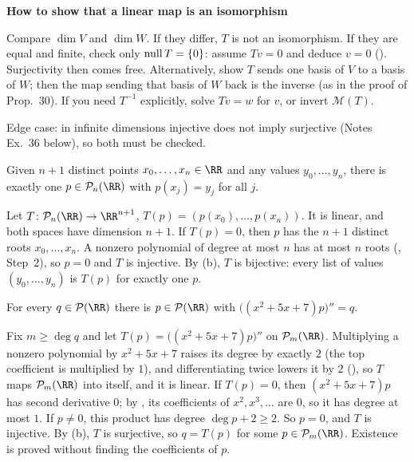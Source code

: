\documentclass[10pt]{scrartcl}
\newcommand{\PP}{\mathcal P}\newcommand{\LL}{\mathcal L}\newcommand{\MM}{\mathcal M}
\newenvironment{methodbox}[1]{\begin{mdframed}[style=methodstyle]\textbf{\color{NavyBlue}#1}\par\vspace{2pt}}{\end{mdframed}}
\begin{document}
\begin{methodbox}{How to show that a linear map is an isomorphism}
  \begin{steps}
    \ii Compare $\dim V$ and $\dim W$. If they differ, $T$ is not an isomorphism.
    \ii If they are equal and finite, check only $\operatorname{null} T=\{0\}$: assume $Tv=0$ and deduce $v=0$ (). Surjectivity then comes free.
    \ii Alternatively, show $T$ sends one basis of $V$ to a basis of $W$; then the map sending that basis of $W$ back is the inverse (as in the proof of Prop.~30).
    \ii If you need $T^{-1}$ explicitly, solve $Tv=w$ for $v$, or invert $\MM(T)$.
  \end{steps}
  Edge case: in infinite dimensions injective does not imply surjective (Notes Ex.~36 below), so both must be checked.
\end{methodbox}

\begin{example*}
  Given $n+1$ distinct points $x_0,\dots,x_n\in\RR$ and any values $y_0,\dots,y_n$, there is exactly one $p\in\PP_n(\RR)$ with $p(x_j)=y_j$ for all $j$.
  \begin{steps}
    \ii Let $T\colon\PP_n(\RR)\to\RR^{n+1}$, $T(p)=(p(x_0),\dots,p(x_n))$. It is linear, and both spaces have dimension $n+1$.
    \ii If $T(p)=0$, then $p$ has the $n+1$ distinct roots $x_0,\dots,x_n$. A nonzero polynomial of degree at most $n$ has at most $n$ roots (, Step~2), so $p=0$ and $T$ is injective.
    \ii By (b), $T$ is bijective: every list of values $(y_0,\dots,y_n)$ is $T(p)$ for exactly one $p$.
  \end{steps}
\end{example*}

\begin{example*}
  For every $q\in\PP(\RR)$ there is $p\in\PP(\RR)$ with $\big((x^2+5x+7)p\big)''=q$.
  \begin{steps}
    \ii Fix $m\ge\deg q$ and let $T(p)=\big((x^2+5x+7)p\big)''$ on $\PP_m(\RR)$. Multiplying a nonzero polynomial by $x^2+5x+7$ raises its degree by exactly $2$ (the top coefficient is multiplied by $1$), and differentiating twice lowers it by $2$ (), so $T$ maps $\PP_m(\RR)$ into itself, and it is linear.
    \ii If $T(p)=0$, then $(x^2+5x+7)p$ has second derivative $0$; by , its coefficients of $x^2,x^3,\dots$ are $0$, so it has degree at most $1$. If $p\ne0$, this product has degree $\deg p+2\ge2$. So $p=0$, and $T$ is injective.
    \ii By (b), $T$ is surjective, so $q=T(p)$ for some $p\in\PP_m(\RR)$. Existence is proved without finding the coefficients of $p$.
  \end{steps}
\end{example*}
\end{document}
